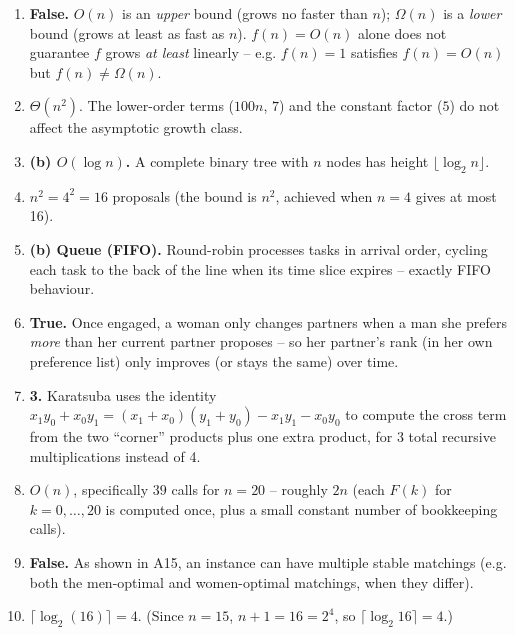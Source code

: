 \documentclass[11pt]{article}
\begin{document}
\begin{enumerate}[label=\textbf{B\arabic*.}, leftmargin=2.2em]

\item \textbf{False.} $O(n)$ is an \emph{upper} bound (grows no faster than $n$);
$\Omega(n)$ is a \emph{lower} bound (grows at least as fast as $n$). $f(n) = O(n)$ alone
does not guarantee $f$ grows \emph{at least} linearly -- e.g. $f(n) = 1$ satisfies
$f(n) = O(n)$ but $f(n) \ne \Omega(n)$.

\item $\Theta(n^2)$. The lower-order terms ($100n$, $7$) and the constant factor ($5$)
do not affect the asymptotic growth class.

\item \textbf{(b) $O(\log n)$.} A complete binary tree with $n$ nodes has height
$\lfloor \log_2 n \rfloor$.

\item $n^2 = 4^2 = 16$ proposals (the bound is $n^2$, achieved when $n=4$ gives at most
16).

\item \textbf{(b) Queue (FIFO).} Round-robin processes tasks in arrival order, cycling
each task to the back of the line when its time slice expires -- exactly FIFO behaviour.

\item \textbf{True.} Once engaged, a woman only changes partners when a man she prefers
\emph{more} than her current partner proposes -- so her partner's rank (in her own
preference list) only improves (or stays the same) over time.

\item \textbf{3.} Karatsuba uses the identity $x_1y_0+x_0y_1 = (x_1+x_0)(y_1+y_0) -
x_1y_1 - x_0y_0$ to compute the cross term from the two ``corner'' products plus one extra
product, for 3 total recursive multiplications instead of 4.

\item $O(n)$, specifically $39$ calls for $n=20$ -- roughly $2n$ (each $F(k)$ for
$k=0,\ldots,20$ is computed once, plus a small constant number of bookkeeping calls).

\item \textbf{False.} As shown in A15, an instance can have multiple stable matchings
(e.g. both the men-optimal and women-optimal matchings, when they differ).

\item $\lceil \log_2(16) \rceil = 4$. (Since $n=15$, $n+1=16=2^4$, so
$\lceil \log_2 16 \rceil = 4$.)

\end{enumerate}
\end{document}
